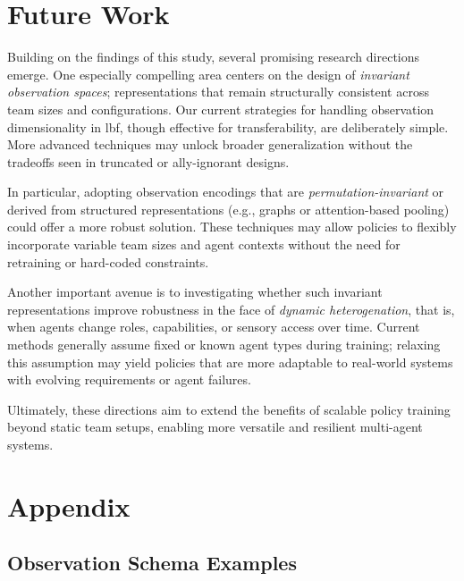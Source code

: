 \documentclass{article}
\begin{document}
\section{Future Work}

Building on the findings of this study, several promising research directions emerge. 
One especially compelling area centers on the design of \emph{invariant observation spaces};
representations that remain structurally consistent across team sizes and configurations. 
Our current strategies for handling observation dimensionality in \gls{lbf}, 
though effective for transferability, are deliberately simple. More advanced techniques may 
unlock broader generalization without the tradeoffs seen in truncated or ally-ignorant designs.

In particular, adopting observation encodings that are \emph{permutation-invariant} or derived 
from structured representations (e.g., graphs or attention-based pooling) 
could offer a more robust solution. These techniques may allow policies to flexibly 
incorporate variable team sizes and agent contexts without the need for retraining or 
hard-coded constraints.

Another important avenue is to investigating whether such invariant representations 
improve robustness in the face of \emph{dynamic heterogenation}, that is, 
when agents change roles, capabilities, or sensory access over time. 
Current methods generally assume fixed or known agent types during training; 
relaxing this assumption may yield policies that are more adaptable to real-world 
systems with evolving requirements or agent failures.

Ultimately, these directions aim to extend the benefits of scalable policy training 
beyond static team setups, enabling more versatile and resilient multi-agent systems.

\printbibliography

\clearpage
\appendix

\section*{Appendix}
\glsresetall


\subsection*{Observation Schema Examples}
\label{con1:app:obs_spaces}
\end{document}
